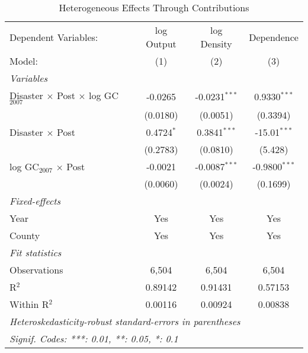 
\begin{table}[htbp]
   \caption{Heterogeneous Effects Through Contributions}
   \centering
   \begin{adjustbox}{max width = \textwidth, center}
      \begin{tabular}{lccc}
         \tabularnewline \midrule \midrule
         Dependent Variables:                              & log Output   & log Density     & Dependence\\  
         Model:                                            & (1)          & (2)             & (3)\\  
         \midrule
         \emph{Variables}\\
         Disaster $\times$ Post $\times$ log GC$_{2007}$   & -0.0265      & -0.0231$^{***}$ & 0.9330$^{***}$\\   
                                                           & (0.0180)     & (0.0051)        & (0.3394)\\   
         Disaster $\times$ Post                            & 0.4724$^{*}$ & 0.3841$^{***}$  & -15.01$^{***}$\\   
                                                           & (0.2783)     & (0.0810)        & (5.428)\\   
         log GC$_{2007}$ $\times$ Post                     & -0.0021      & -0.0087$^{***}$ & -0.9800$^{***}$\\   
                                                           & (0.0060)     & (0.0024)        & (0.1699)\\   
         \midrule
         \emph{Fixed-effects}\\
         Year                                              & Yes          & Yes             & Yes\\  
         County                                            & Yes          & Yes             & Yes\\  
         \midrule
         \emph{Fit statistics}\\
         Observations                                      & 6,504        & 6,504           & 6,504\\  
         R$^2$                                             & 0.89142      & 0.91431         & 0.57153\\  
         Within R$^2$                                      & 0.00116      & 0.00924         & 0.00838\\  
         \midrule \midrule
         \multicolumn{4}{l}{\emph{Heteroskedasticity-robust standard-errors in parentheses}}\\
         \multicolumn{4}{l}{\emph{Signif. Codes: ***: 0.01, **: 0.05, *: 0.1}}\\
      \end{tabular}
   \end{adjustbox}
\end{table}


